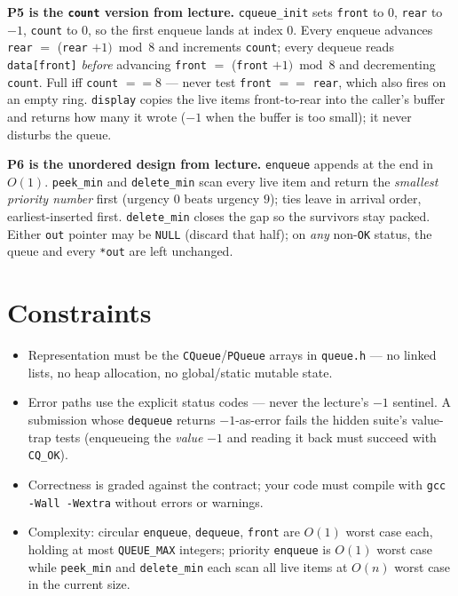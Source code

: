 \documentclass[11pt]{article}
\begin{document}
\textbf{P5 is the \texttt{count} version from lecture.} \texttt{cqueue\_init} sets \texttt{front} to $0$, \texttt{rear} to $-1$, \texttt{count} to $0$, so the first enqueue lands at index $0$. Every enqueue advances \texttt{rear} $=$ (\texttt{rear} $+ 1) \bmod 8$ and increments \texttt{count}; every dequeue reads \texttt{data[front]} \emph{before} advancing \texttt{front} $=$ (\texttt{front} $+ 1) \bmod 8$ and decrementing \texttt{count}. Full iff \texttt{count} $== 8$ --- never test \texttt{front} $==$ \texttt{rear}, which also fires on an empty ring. \texttt{display} copies the live items front-to-rear into the caller's buffer and returns how many it wrote ($-1$ when the buffer is too small); it never disturbs the queue.

\textbf{P6 is the unordered design from lecture.} \texttt{enqueue} appends at the end in $O(1)$. \texttt{peek\_min} and \texttt{delete\_min} scan every live item and return the \emph{smallest priority number} first (urgency $0$ beats urgency $9$); ties leave in arrival order, earliest-inserted first. \texttt{delete\_min} closes the gap so the survivors stay packed. Either \texttt{out} pointer may be \texttt{NULL} (discard that half); on \emph{any} non-\texttt{OK} status, the queue and every \texttt{*out} are left unchanged.

\section{Constraints}

\begin{itemize}
  \item Representation must be the \texttt{CQueue}/\texttt{PQueue} arrays in \texttt{queue.h} --- no linked lists, no heap allocation, no global/static mutable state.
  \item Error paths use the explicit status codes --- never the lecture's $-1$ sentinel. A submission whose \texttt{dequeue} returns $-1$-as-error fails the hidden suite's value-trap tests (enqueueing the \emph{value} $-1$ and reading it back must succeed with \texttt{CQ\_OK}).
  \item Correctness is graded against the contract; your code must compile with \texttt{gcc -Wall -Wextra} without errors or warnings.
  \item Complexity: circular \texttt{enqueue}, \texttt{dequeue}, \texttt{front} are $O(1)$ worst case each, holding at most \texttt{QUEUE\_MAX} integers; priority \texttt{enqueue} is $O(1)$ worst case while \texttt{peek\_min} and \texttt{delete\_min} each scan all live items at $O(n)$ worst case in the current size.
\end{itemize}
\end{document}
